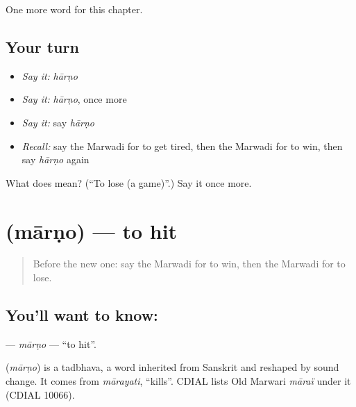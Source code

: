 \begin{grammarlens}[title={What you've built}]
One more word for this chapter.
\end{grammarlens}

\subsection*{Your turn}
\begin{itemize}
\raggedright
  \item \emph{Say it:} \emph{hārṇo}
  \item \emph{Say it:} \emph{hārṇo}, once more
  \item \emph{Say it:} say \emph{hārṇo}
  \item \emph{Recall:} say the Marwadi for to get tired, then the Marwadi for to win, then say \emph{hārṇo} again
\end{itemize}

\begin{tcolorbox}[breakable,colback=teal!4,colframe=teal!35!black,title={Before you move on}]
What does  mean? (\textquotedblleft{}To lose (a game)\textquotedblright{}.) Say it once more.
\end{tcolorbox}
\section[\texorpdfstring{\mw{मारणो} (mārṇo)}{मारणो (mārṇo)}]{ (mārṇo) — to hit}

\label{lesson:MW-C109-marno}



\begin{quote}
Before the new one: say the Marwadi for to win, then the Marwadi for to lose.
\end{quote}

\subsection*{You'll want to know: }
\textbf{} — \emph{mārṇo} — \textquotedblleft{}to hit\textquotedblright{}.

\begin{cousinweb}
\textbf{} (\emph{mārṇo}) is a tadbhava, a word inherited from Sanskrit and reshaped by sound change. It comes from \emph{mārayati}, \textquotedblleft{}kills\textquotedblright{}. CDIAL lists Old Marwari \emph{māraï} under it (CDIAL 10066).
\end{cousinweb}

